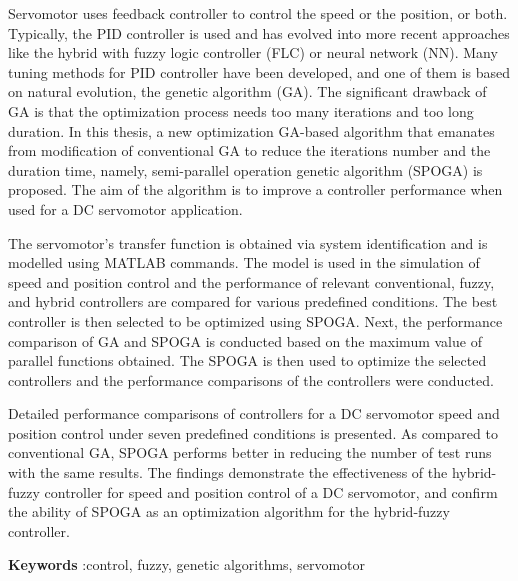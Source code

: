 Servomotor uses feedback controller to control the speed or the position, or both. Typically, the PID controller is used and has evolved into more recent approaches like the hybrid with fuzzy logic controller (FLC) or neural network (NN). Many tuning methods for PID controller have been developed, and one of them is based on natural evolution, the genetic algorithm (GA). The significant drawback of GA is that the optimization process needs too many iterations and too long duration. In this thesis, a new optimization GA-based algorithm that emanates from modification of conventional GA to reduce the iterations number and the duration time, namely, semi-parallel operation genetic algorithm (SPOGA) is proposed. The aim of the algorithm is to improve a controller performance when used for a DC servomotor application.


The servomotor's transfer function is obtained via system identification and is modelled using MATLAB commands. The model is used in the simulation of speed and position control and the performance of relevant conventional, fuzzy, and hybrid controllers are compared for various predefined conditions. The best controller is then selected to be optimized using SPOGA. Next, the performance comparison of GA and SPOGA is conducted based on the maximum value of parallel functions obtained. The SPOGA is then used to optimize the selected controllers and the performance comparisons of the controllers were conducted. 


Detailed performance comparisons of controllers for a DC servomotor speed and position control under seven predefined conditions is presented. As compared to conventional GA, SPOGA performs better in reducing the number of test runs with the same results. The findings demonstrate the effectiveness of the hybrid-fuzzy controller for speed and position control of a DC servomotor, and confirm the ability of SPOGA as an optimization algorithm for the hybrid-fuzzy controller.


\noindent\textbf{Keywords} :control, fuzzy, genetic algorithms, servomotor